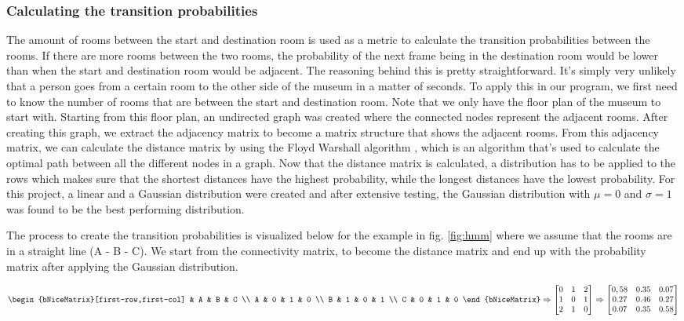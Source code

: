 \subsubsection{Calculating the transition probabilities}
The amount of rooms between the start and destination room is used as a metric to calculate the transition probabilities between the rooms. If there are more rooms between the two rooms, the probability of the next frame being in the destination room would be lower than when the start and destination room would be adjacent. The reasoning behind this is pretty straightforward. It’s simply very unlikely that a person goes from a certain room to the other side of the museum in a matter of seconds.
To apply this in our program, we first need to know the number of rooms that are between the start and destination room. Note that we only have the floor plan of the museum to start with. Starting from this floor plan, an undirected graph was created where the connected nodes represent the adjacent rooms. After creating this graph, we extract the adjacency matrix to become a matrix structure that shows the adjacent rooms.
From this adjacency matrix, we can calculate the distance matrix by using the Floyd Warshall algorithm \cite{floyd_warshall}, which is an algorithm that’s used to calculate the optimal path between all the different nodes in a graph.
Now that the distance matrix is calculated, a distribution has to be applied to the rows which makes sure that the shortest distances have the highest probability, while the longest distances have the lowest probability. For this project, a linear and a Gaussian distribution were created and after extensive testing, the Gaussian distribution with $\mu = 0$ and $\sigma = 1$ was found to be the best performing distribution. \par 
The process to create the transition probabilities is visualized below for the example in fig. \ref{fig:hmm} where we assume that the rooms are in a straight line (A - B - C). We start from the connectivity matrix, to become the distance matrix and end up with the probability matrix after applying the Gaussian distribution.

\[
\begin{bNiceMatrix}[first-row,first-col]
  & A & B & C \\
A & 0 & 1 & 0 \\
B & 1 & 0 & 1 \\
C & 0 & 1 & 0 
\end{bNiceMatrix} 
\Rightarrow
\begin{bmatrix}
0 & 1 & 2 \\
1 & 0 & 1 \\
2 & 1 & 0 \\
\end{bmatrix}
\Rightarrow
\begin{bmatrix}
0,58 & 0.35 & 0.07 \\
0.27 & 0.46 & 0.27 \\
0.07 & 0.35 & 0.58 \\
\end{bmatrix}
\]

